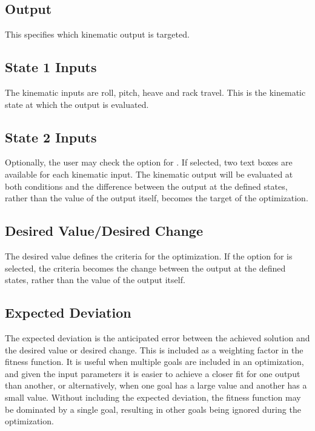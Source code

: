 \subsection{Output} \label{ssec:goalsOutput}

This specifies which kinematic output is targeted.

\subsection{State 1 Inputs} \label{ssec:goalsState1Inputs}

The kinematic inputs are roll, pitch, heave and rack travel.  This is the kinematic state at which the output is evaluated.

\subsection{State 2 Inputs} \label{ssec:goalsState2Inputs}

Optionally, the user may check the option for .  If selected, two text boxes are available for each kinematic input.  The kinematic output will be evaluated at both conditions and the difference between the output at the defined states, rather than the value of the output itself, becomes the target of the optimization.

\subsection{Desired Value/Desired Change} \label{ssec:goalsDesiredValue}

The desired value defines the criteria for the optimization.  If the option for  is selected, the criteria becomes the change between the output at the defined states, rather than the value of the output itself.

\subsection{Expected Deviation} \label{ssec:goalsExpectedDeviation}

The expected deviation is the anticipated error between the achieved solution and the desired value or desired change.  This is included as a weighting factor in the fitness function.  It is useful when multiple goals are included in an optimization, and given the input parameters it is easier to achieve a closer fit for one output than another, or alternatively, when one goal has a large value and another has a small value.  Without including the expected deviation, the fitness function may be dominated by a single goal, resulting in other goals being ignored during the optimization.

